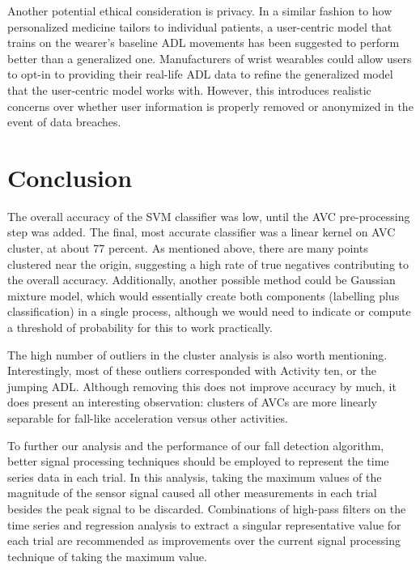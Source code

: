 \documentclass{llncs}
\begin{document}
	Another potential ethical consideration is privacy. In a similar fashion to how personalized medicine tailors to individual patients, a user-centric model that trains on the wearer's baseline ADL movements has been suggested to perform better than a generalized one.\cite{villar2019online} Manufacturers of wrist wearables could allow users to opt-in to providing their real-life ADL data to refine the generalized model that the user-centric model works with. However, this introduces realistic concerns over whether user information is properly removed or anonymized in the event of data breaches.

    
\section{Conclusion}

	The overall accuracy of the SVM classifier was low, until the AVC pre-processing step was added. The final, most accurate classifier was a linear kernel on AVC cluster, at about 77 percent. As mentioned above, there are many points clustered near the origin, suggesting a high rate of true negatives contributing to the overall accuracy. Additionally, another possible method could be Gaussian mixture model, which would essentially create both components (labelling plus classification) in a single process, although we would need to indicate or compute a threshold of probability for this to work practically.

	The high number of outliers in the cluster analysis is also worth mentioning. Interestingly, most of these outliers corresponded with Activity ten, or the jumping ADL. Although removing this does not improve accuracy by much, it does present an interesting observation: clusters of AVCs are more linearly separable for fall-like acceleration versus other activities.  

	To further our analysis and the performance of our fall detection algorithm, better signal processing techniques should be employed to represent the time series data in each trial. In this analysis, taking the maximum values of the magnitude of the sensor signal caused all other measurements in each trial besides the peak signal to be discarded. Combinations of high-pass filters on the time series and regression analysis to extract a singular representative value for each trial are recommended as improvements over the current signal processing technique of taking the maximum value. 
\end{document}
